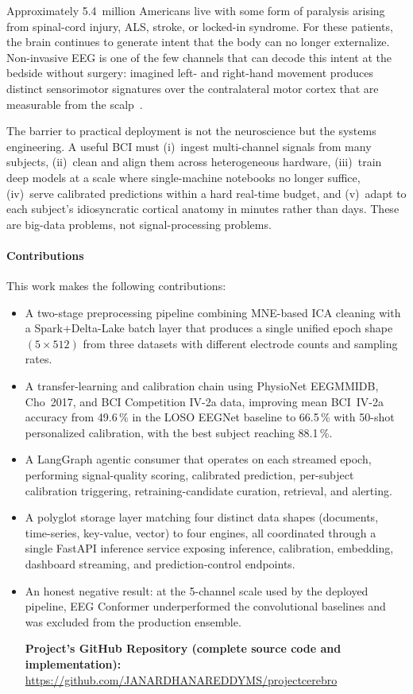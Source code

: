 \documentclass[conference]{IEEEtran}
\begin{document}
Approximately 5.4~million Americans live with some form of paralysis arising
from spinal-cord injury, ALS, stroke, or locked-in syndrome. For these
patients, the brain continues to generate intent that the body can no longer
externalize. Non-invasive EEG is one of the few channels that can decode this
intent at the bedside without surgery: imagined left- and right-hand movement
produces distinct sensorimotor signatures over the contralateral motor cortex
that are measurable from the scalp~\cite{ref:lotte2018,ref:lawhern2018}.

The barrier to practical deployment is not the neuroscience but the systems
engineering. A useful BCI must (i)~ingest multi-channel signals from many
subjects, (ii)~clean and align them across heterogeneous hardware, (iii)~train
deep models at a scale where single-machine notebooks no longer suffice,
(iv)~serve calibrated predictions within a hard real-time budget, and (v)~adapt
to each subject's idiosyncratic cortical anatomy in minutes rather than days.
These are big-data problems, not signal-processing problems.

\paragraph{Contributions} This work makes the following contributions:
\begin{itemize}
\item A two-stage preprocessing pipeline combining MNE-based ICA cleaning
      with a Spark+Delta-Lake batch layer that produces a single unified
      epoch shape $(5 \times 512)$ from three datasets with different
      electrode counts and sampling rates.
\item A transfer-learning and calibration chain using PhysioNet EEGMMIDB,
      Cho~2017, and BCI Competition IV-2a data, improving mean BCI~IV-2a
      accuracy from 49.6\,\% in the LOSO EEGNet baseline to 66.5\,\% with
      50-shot personalized calibration, with the best subject reaching
      88.1\,\%.
\item A LangGraph agentic consumer that operates on each streamed epoch,
      performing signal-quality scoring, calibrated prediction, per-subject
      calibration triggering, retraining-candidate curation, retrieval, and
      alerting.
\item A polyglot storage layer matching four distinct data shapes (documents,
      time-series, key-value, vector) to four engines, all coordinated through
      a single FastAPI inference service exposing inference, calibration,
      embedding, dashboard streaming, and prediction-control endpoints.
\item An honest negative result: at the 5-channel scale used by the deployed
      pipeline, EEG Conformer underperformed the convolutional baselines and
      was excluded from the production ensemble.
\par
      \vspace{0.5em}
\noindent\textbf{Project's GitHub Repository (complete source code and implementation):}
\url{https://github.com/JANARDHANAREDDYMS/projectcerebro}


\end{itemize}
\end{document}
